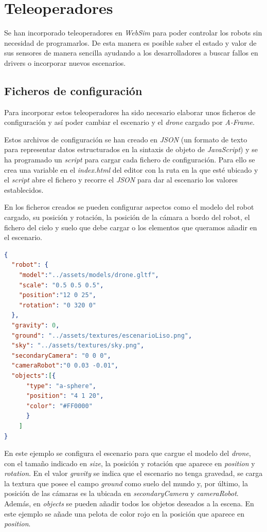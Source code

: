 \section{Teleoperadores}
\label{sec:teleoperadores}

Se han incorporado teleoperadores en \textit{WebSim} para poder controlar los robots sin necesidad de programarlos. De esta manera es posible saber el estado y valor de sus sensores de manera sencilla ayudando a los desarrolladores a buscar fallos en drivers o incorporar nuevos escenarios. 

\subsection{Ficheros de configuración}

Para incorporar estos teleoperadores ha sido necesario elaborar unos ficheros de configuración y así poder cambiar el escenario y el \textit{drone} cargado por \textit{A-Frame}. 

Estos archivos de configuración se han creado en \textit{JSON} (un formato de texto para representar datos estructurados en la sintaxis de objeto de \textit{JavaScript}) y se ha programado un \textit{script} para cargar cada fichero de configuración. Para ello se crea una variable en el \textit{index.html} del editor con la ruta en la que esté ubicado y el \textit{script} abre el fichero y recorre el \textit{JSON} para dar al escenario los valores establecidos. \newline

En los ficheros creados se pueden configurar aspectos como el modelo del robot cargado, su posición y rotación, la posición de la cámara a bordo del robot, el fichero del cielo y suelo que debe cargar o los elementos que queramos añadir en el escenario. \newline

\begin{lstlisting}[language=json, caption=Ejemplo de fichero de configuración]
  {
  "robot": {
    "model":"../assets/models/drone.gltf",
    "scale": "0.5 0.5 0.5",
    "position":"12 0 25",
    "rotation": "0 320 0"
  },
  "gravity": 0,
  "ground": "../assets/textures/escenarioLiso.png",
  "sky": "../assets/textures/sky.png",
  "secondaryCamera": "0 0 0",
  "cameraRobot":"0 0.03 -0.01",
  "objects":[{
      "type": "a-sphere",
      "position": "4 1 20",
      "color": "#FF0000"
      }
    ]
}
\end{lstlisting}

En este ejemplo se configura el escenario para que cargue el modelo del \textit{drone}, con el tamaño indicado en \textit{size}, la posición y rotación que aparece en \textit{position} y \textit{rotation}. En el valor \textit{gravity} se indica que el escenario no tenga gravedad, se carga la textura que posee el campo \textit{ground} como suelo del mundo y, por último, la posición de las cámaras es la ubicada en \textit{secondaryCamera} y \textit{cameraRobot}. Además, en \textit{objects} se pueden añadir todos los objetos deseados a la escena. En este ejemplo se añade una pelota de color rojo en la posición que aparece en \textit{position}.

